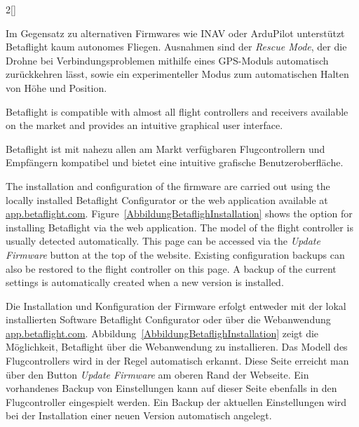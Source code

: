 \begin{paracol}{2}[]
\colger

Im Gegensatz zu alternativen Firmwares wie INAV oder ArduPilot unterstützt Betaflight kaum autonomes Fliegen. Ausnahmen sind der \textsl{Rescue Mode}, der die Drohne bei Verbindungsproblemen mithilfe eines GPS-Moduls automatisch zurückkehren lässt, sowie ein experimenteller Modus zum automatischen Halten von Höhe und Position.
 
\coleng

Betaflight is compatible with almost all flight controllers and receivers available on the market and provides an intuitive graphical user interface.

\colger

Betaflight ist mit nahezu allen am Markt verfügbaren Flugcontrollern und Empfängern kompatibel und bietet eine intuitive grafische Benutzeroberfläche.

\colende

\renewcommand{\deutschertitel}{Installation und Konfiguration}
\renewcommand{\englischertitel}{Installation and Configuration}
\makrounterabschnitt
\label{AbschnittInstallationBetaflight}

The installation and configuration of the firmware are carried out using the locally installed Betaflight Configurator or the web application available at \url{app.betaflight.com}. Figure~\ref{AbbildungBetaflighInstallation} shows the option for installing Betaflight via the web application. The model of the flight controller is usually detected automatically. This page can be accessed via the \textsl{Update Firmware} button at the top of the website. Existing configuration backups can also be restored to the flight controller on this page. A backup of the current settings is automatically created when a new version is installed.

\colger

Die Installation und Konfiguration der Firmware erfolgt entweder mit der lokal installierten Software Betaflight Configurator oder über die Webanwendung \url{app.betaflight.com}. Abbildung~\ref{AbbildungBetaflighInstallation} zeigt die Möglichkeit, Betaflight über die Webanwendung zu installieren. Das Modell des Flugcontrollers wird in der Regel automatisch erkannt. Diese Seite erreicht man über den Button \textsl{Update Firmware} am oberen Rand der Webseite. Ein vorhandenes Backup von Einstellungen kann auf dieser Seite ebenfalls in den Flugcontroller eingespielt werden. Ein Backup der aktuellen Einstellungen wird bei der Installation einer neuen Version automatisch angelegt.


\end{paracol}
